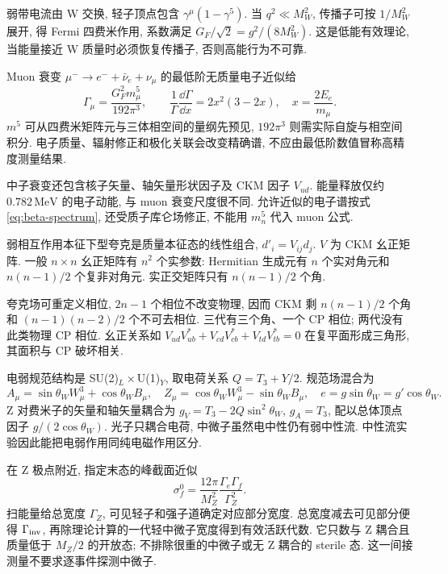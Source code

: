 \label{ch:weak}
弱带电流由 W 交换, 轻子顶点包含 $\gamma^\mu(1-\gamma^5)$. 当 $q^2\ll M_W^2$, 传播子可按 $1/M_W^2$ 展开, 得 Fermi 四费米作用, 系数满足 $G_F/\sqrt2=g^2/(8M_W^2)$. 这是低能有效理论, 当能量接近 W 质量时必须恢复传播子, 否则高能行为不可靠.

Muon 衰变 $\mu^-\to e^-+\bar\nu_e+\nu_\mu$ 的最低阶无质量电子近似给
\begin{equation}
 \Gamma_\mu=\frac{G_F^2m_\mu^5}{192\pi^3},\qquad
 \frac1\Gamma\frac{\dd\Gamma}{\dd x}=2x^2(3-2x),\quad x=\frac{2E_e}{m_\mu}.
\end{equation}
$m^5$ 可从四费米矩阵元与三体相空间的量纲先预见, $192\pi^3$ 则需实际自旋与相空间积分. 电子质量、辐射修正和极化关联会改变精确谱, 不应由最低阶数值冒称高精度测量结果.

中子衰变还包含核子矢量、轴矢量形状因子及 CKM 因子 $V_{ud}$. 能量释放仅约 $0.782\,\mathrm{MeV}$ 的电子动能, 与 muon 衰变尺度很不同. 允许近似的电子谱按式 \eqref{eq:beta-spectrum}, 还受质子库仑场修正, 不能用 $m_n^5$ 代入 muon 公式.

弱相互作用本征下型夸克是质量本征态的线性组合, $d'_i=V_{ij}d_j$. $V$ 为 CKM 幺正矩阵. 一般 $n\times n$ 幺正矩阵有 $n^2$ 个实参数: Hermitian 生成元有 $n$ 个实对角元和 $n(n-1)/2$ 个复非对角元. 实正交矩阵只有 $n(n-1)/2$ 个角.

夸克场可重定义相位, $2n-1$ 个相位不改变物理, 因而 CKM 剩 $n(n-1)/2$ 个角和 $(n-1)(n-2)/2$ 个不可去相位. 三代有三个角、一个 CP 相位; 两代没有此类物理 CP 相位. 幺正关系如 $V_{ud}V_{ub}^*+V_{cd}V_{cb}^*+V_{td}V_{tb}^*=0$ 在复平面形成三角形, 其面积与 CP 破坏相关.

电弱规范结构是 SU(2)$_L\times$U(1)$_Y$, 取电荷关系 $Q=T_3+Y/2$. 规范场混合为
\begin{equation}
 A_\mu=\sin\theta_W W^3_\mu+\cos\theta_WB_\mu,
 \quad Z_\mu=\cos\theta_WW^3_\mu-\sin\theta_WB_\mu,
 \quad e=g\sin\theta_W=g'\cos\theta_W.
\end{equation}
Z 对费米子的矢量和轴矢量耦合为 $g_V=T_3-2Q\sin^2\theta_W$, $g_A=T_3$, 配以总体顶点因子 $g/(2\cos\theta_W)$. 光子只耦合电荷, 中微子虽然电中性仍有弱中性流. 中性流实验因此能把电弱作用同纯电磁作用区分.

在 Z 极点附近, 指定末态的峰截面近似
\begin{equation}
 \sigma_f^0=\frac{12\pi}{M_Z^2}\frac{\Gamma_e\Gamma_f}{\Gamma_Z^2}.
\end{equation}
扫能量给总宽度 $\Gamma_Z$, 可见轻子和强子道确定对应部分宽度. 总宽度减去可见部分便得 $\Gamma_{\rm inv}$, 再除理论计算的一代轻中微子宽度得到有效活跃代数. 它只数与 Z 耦合且质量低于 $M_Z/2$ 的开放态; 不排除很重的中微子或无 Z 耦合的 sterile 态. 这一间接测量不要求逐事件探测中微子.
